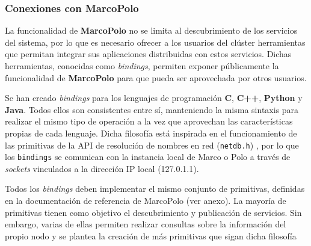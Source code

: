 

\subsubsection{Conexiones con MarcoPolo}

La funcionalidad de \textbf{MarcoPolo} no se limita al descubrimiento de los servicios del sistema, por lo que es necesario ofrecer a los usuarios del clúster herramientas que permitan integrar sus aplicaciones distribuidas con estos servicios. Dichas herramientas, conocidas como \textit{bindings}, permiten exponer públicamente la funcionalidad de \textbf{MarcoPolo} para que pueda ser aprovechada por otros usuarios.

Se han creado \textit{bindings} para los lenguajes de programación \textbf{C}, \textbf{C++}, \textbf{Python} y \textbf{Java}. Todos ellos son consistentes entre sí, manteniendo la misma sintaxis para realizar el mismo tipo de operación a la vez que aprovechan las características propias de cada lenguaje. Dicha filosofía está inspirada en el funcionamiento de las primitivas de la API de resolución de nombres en red (\texttt{netdb.h}) \cite{netdb}, por lo que los \texttt{bindings} se comunican con la instancia local de Marco o Polo a través de \textit{sockets} vinculados a la dirección IP local (127.0.1.1).

Todos los \textit{bindings} deben implementar el mismo conjunto de primitivas, definidas en la documentación de referencia de MarcoPolo (ver anexo\citationneeded[TODO]). La mayoría de primitivas tienen como objetivo el descubrimiento y publicación de servicios. Sin embargo, varias de ellas permiten realizar consultas sobre la información del propio nodo y se plantea la creación de más primitivas que sigan dicha filosofía

